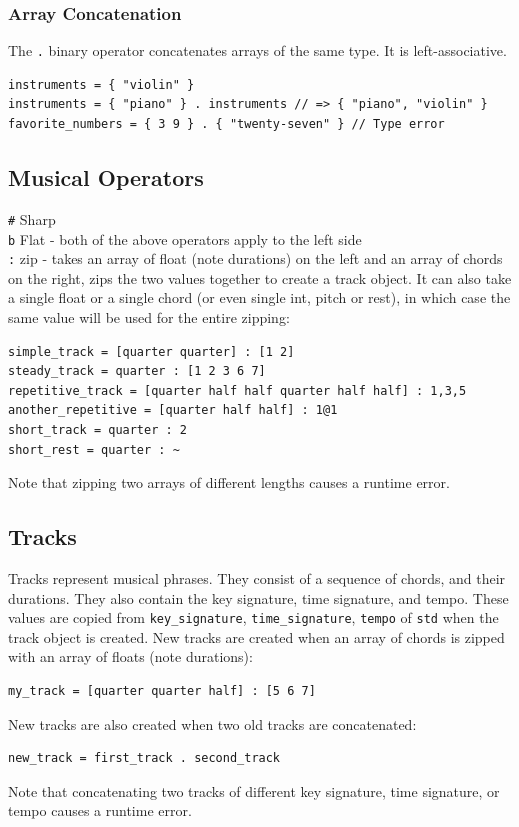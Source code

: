 \documentclass[11pt, onecolumn, letterpaper]{article}
\begin{document}
\subsubsection{Array Concatenation}
The \texttt{.} binary operator concatenates arrays of the same type. It is left-associative.

\begin{lstlisting}
instruments = { "violin" }
instruments = { "piano" } . instruments // => { "piano", "violin" }
favorite_numbers = { 3 9 } . { "twenty-seven" } // Type error
\end{lstlisting}

\subsection{Musical Operators}

\texttt{\#} Sharp \\
\texttt{b} Flat - both of the above operators apply to the left side\\
\texttt{:} zip - takes an array of float (note durations) on the left and an array of chords on the right, zips the two values together to create a track object. It can also take a single float or a single chord (or even single int, pitch or rest), in which case the same value will be used for the entire zipping:
\begin{lstlisting}
simple_track = [quarter quarter] : [1 2]
steady_track = quarter : [1 2 3 6 7]
repetitive_track = [quarter half half quarter half half] : 1,3,5
another_repetitive = [quarter half half] : 1@1
short_track = quarter : 2
short_rest = quarter : ~
\end{lstlisting}
Note that zipping two arrays of different lengths causes a runtime error.

\subsection{Tracks}
Tracks represent musical phrases. They consist of a sequence of chords, and their durations. They also contain the key signature, time signature, and tempo. These values are copied from \texttt{key\_signature}, \texttt{time\_signature}, \texttt{tempo} of \texttt{std} when the track object is created. New tracks are created when an array of chords is zipped with an array of floats (note durations):
\begin{lstlisting}
my_track = [quarter quarter half] : [5 6 7]
\end{lstlisting}
New tracks are also created when two old tracks are concatenated:
\begin{lstlisting}
new_track = first_track . second_track
\end{lstlisting}
Note that concatenating two tracks of different key signature, time signature, or tempo causes a runtime error.
\end{document}
